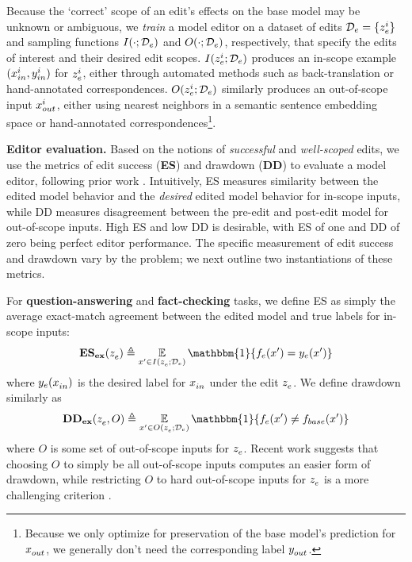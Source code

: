 \documentclass{article}
\begin{document}
Because the `correct' scope of an edit's effects on the base model may be unknown or ambiguous, we \textit{train} a model editor on a dataset of edits $\editdata =\{\ze[i]\}$ and sampling functions $I(\cdot; \editdata)$ and $O(\cdot; \editdata)$, respectively, that specify the edits of interest and their desired edit scopes. $I(\ze[i]; \editdata)$ produces an in-scope example $(\xtest[i], \ytest[i])$ for $\ze[i]$, either through automated methods such as back-translation or hand-annotated correspondences. $O(\ze[i]; \editdata)$ similarly produces an out-of-scope input $\xloc[i]$, either using nearest neighbors in a semantic sentence embedding space or hand-annotated correspondences\footnote{Because we only optimize for preservation of the base model's prediction for $\xloc$, we generally don't need the corresponding label $\yloc$.}.

\textbf{Editor evaluation.} Based on the notions of \textit{successful} and \textit{well-scoped} edits, we use the metrics of edit success (\textbf{ES}) and drawdown (\textbf{DD}) to evaluate a model editor, following prior work \citep{Sinitsin2020Editable,mitchell2021fast}. Intuitively, ES measures similarity between the edited model behavior and the \textit{desired} edited model behavior for in-scope inputs, while DD measures disagreement between the pre-edit and post-edit model for out-of-scope inputs. High ES and low DD is desirable, with ES of one and DD of zero being perfect editor performance. The specific measurement of edit success and drawdown vary by the problem; we next outline two instantiations of these metrics.

For \textbf{question-answering} and \textbf{fact-checking} tasks, we define ES as simply the average exact-match agreement between the edited model and true labels for in-scope inputs:
\begin{equation}
    \mathbf{ES_{ex}}(\ze) \triangleq \E_{x' \in I(\ze; \editdata)} \mathbbm{1}\{\editedmodel(x') = \ye[x']\}
\end{equation}
where $\ye[\xtest]$ is the desired label for $\xtest$ under the edit $\ze$.
We define drawdown similarly as
\begin{equation}
    \mathbf{DD_{ex}}(\ze,O) \triangleq \E_{x' \in O(\ze; \editdata)} \mathbbm{1}\{\editedmodel(x') \neq \basemodel(x')\}
\end{equation}
where $O$ is some set of out-of-scope inputs for $\ze$. Recent work suggests that choosing $O$ to simply be all out-of-scope inputs computes an easier form of drawdown, while restricting $O$ to hard out-of-scope inputs for $\ze$ is a more challenging criterion \citep{hase2021language}.
\end{document}

